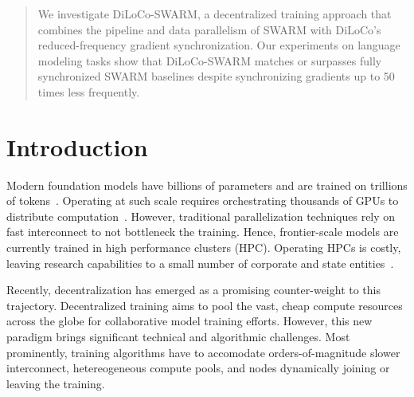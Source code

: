 \documentclass{article}
\begin{document}
\begin{abstract}
  We investigate DiLoCo-SWARM, a decentralized training approach that combines
  the pipeline and data parallelism of SWARM with DiLoCo's reduced-frequency
  gradient synchronization. Our experiments on language modeling tasks show that
  DiLoCo-SWARM matches or surpasses fully synchronized SWARM baselines despite
  synchronizing gradients up to 50 times less frequently.
\end{abstract}

\section{Introduction}

Modern foundation models have billions of parameters and are trained on
trillions of
tokens~\cite{chowdhery2022palm,brown2023gpt3,dubey2024llama3,google2024gemini}.
Operating at such scale requires orchestrating thousands of GPUs to distribute
computation~\cite{dubey2024llama3,deepseekai2024}. However, traditional
parallelization techniques rely on fast interconnect to not bottleneck the
training. Hence, frontier-scale models are currently trained in high performance
clusters (HPC). Operating HPCs is costly, leaving research capabilities to a
small number of corporate and state entities~\cite{jaghouar2024intellect1}. 


Recently, decentralization has emerged as a promising counter-weight to this
trajectory. Decentralized training aims to pool the vast, cheap compute
resources across the globe for collaborative model training efforts. However,
this new paradigm brings significant technical and algorithmic challenges. Most
prominently, training algorithms have to accomodate orders-of-magnitude slower
interconnect, hetereogeneous compute pools, and nodes dynamically joining or
leaving the training. 
\end{document}
